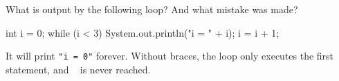 \Q What is output by the following loop? And what mistake was made?

\begin{minipage}{0.49\textwidth}
\begin{javalst}
    int i = 0;
    while (i < 3) 
        System.out.println("i = " + i);
        i = i + 1;
\end{javalst}
\end{minipage}
\hfill
\begin{minipage}{0.49\textwidth}
\begin{answer}[5em]
It will print \texttt{"i = 0"} forever. Without braces, the loop only executes the first statement, and ~ is never reached.
\end{answer}
\end{minipage}
\vspace{1ex}
